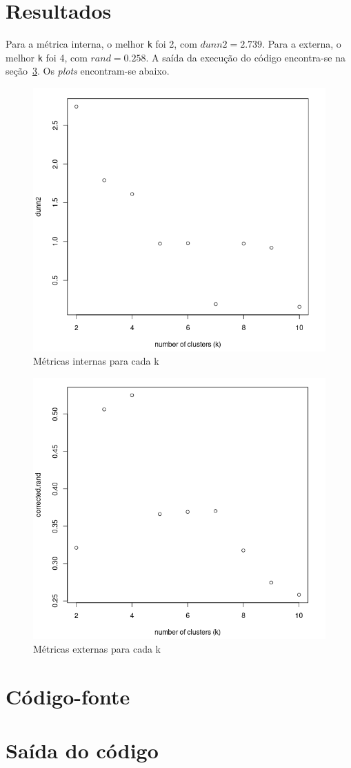 \documentclass[10pt]{article}
\newcommand{\tit}[1]{\textit{#1}}
\newcommand{\ttt}[1]{\texttt{#1}}
\begin{document}
\section{Resultados}
Para a métrica interna, o melhor \ttt{k} foi 2, com $dunn2 = 2.739$.
Para a externa, o melhor \ttt{k} foi 4, com $rand = 0.258$.
A saída da execução do código encontra-se na seção~\ref{output}.
Os \tit{plots} encontram-se abaixo.
\newpage
\begin{figure}[H]
    \centering
    \includegraphics[width=0.6\linewidth]{dunn2.png}
    \caption{Métricas internas para cada k}
\end{figure}

\begin{figure}[H]
    \centering
    \includegraphics[width=0.6\linewidth]{rand.png}
    \caption{Métricas externas para cada k}
\end{figure}

\newpage
\section{Código-fonte}
\label{code}


\newpage

\section{Saída do código}
\label{output}

\end{document}
